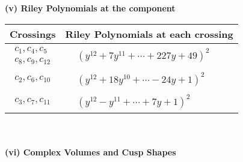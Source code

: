 \documentclass[1p]{elsarticle_modified}
\theoremstyle{definition}
\begin{document}
\newpage\renewcommand{\arraystretch}{1}
\flushleft \textbf{(v) Riley Polynomials at the component}\newline \\
\begin{tabular}{m{50pt}|m{274pt}}
Crossings & \hspace{64pt}Riley Polynomials at each crossing \\
\hline $$\begin{aligned}c_{1},c_{4},c_{5}\\c_{8},c_{9},c_{12}\end{aligned}$$&$\begin{aligned}
&(y^{12}+7 y^{11}+\cdots+227 y+49)^{2}
\end{aligned}$\\
\hline $$\begin{aligned}c_{2},c_{6},c_{10}\end{aligned}$$&$\begin{aligned}
&(y^{12}+18 y^{10}+\cdots-24 y+1)^{2}
\end{aligned}$\\
\hline $$\begin{aligned}c_{3},c_{7},c_{11}\end{aligned}$$&$\begin{aligned}
&(y^{12}- y^{11}+\cdots+7 y+1)^{2}
\end{aligned}$\\
\hline
\end{tabular}\\~\\
\newpage\flushleft \textbf{(vi) Complex Volumes and Cusp Shapes}
\end{document}
